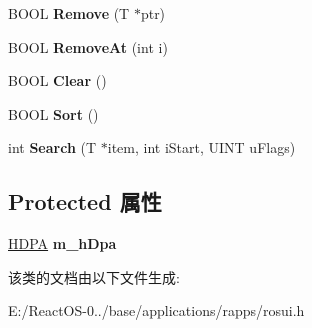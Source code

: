 \begin{DoxyCompactItemize}
B\+O\+OL {\bfseries Remove} (T $\ast$ptr)
\item 
\mbox{\label{class_c_pointer_array_a6ab68993e5b4b9c5bd7cea038030e1e5}} 
B\+O\+OL {\bfseries Remove\+At} (int i)
\item 
\mbox{\label{class_c_pointer_array_a985c1ceef9b936f1e29cfd049c02a857}} 
B\+O\+OL {\bfseries Clear} ()
\item 
\mbox{\label{class_c_pointer_array_a7e567c77de0a5d88e6a8771a24035959}} 
B\+O\+OL {\bfseries Sort} ()
\item 
\mbox{\label{class_c_pointer_array_ac773b039a930734d373ca7f7df62eb08}} 
int {\bfseries Search} (T $\ast$item, int i\+Start, U\+I\+NT u\+Flags)
\end{DoxyCompactItemize}
\subsection*{Protected 属性}
\begin{DoxyCompactItemize}
\item 
\mbox{\label{class_c_pointer_array_a50835cc99940813b92f52b371326d645}} 
\hyperlink{struct___d_p_a}{H\+D\+PA} {\bfseries m\+\_\+h\+Dpa}
\end{DoxyCompactItemize}


该类的文档由以下文件生成\+:\begin{DoxyCompactItemize}
\item 
E\+:/\+React\+O\+S-\/0../base/applications/rapps/rosui.\+h\end{DoxyCompactItemize}
